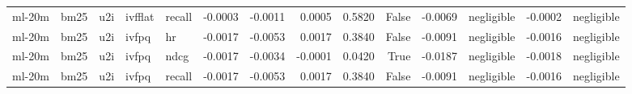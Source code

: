 \begin{tabular}{lllllrrrrrrlrl}
ml-20m & bm25 & u2i & ivfflat & recall & -0.0003 & -0.0011 & 0.0005 & 0.5820 & False & -0.0069 & negligible & -0.0002 & negligible \\
ml-20m & bm25 & u2i & ivfpq & hr & -0.0017 & -0.0053 & 0.0017 & 0.3840 & False & -0.0091 & negligible & -0.0016 & negligible \\
ml-20m & bm25 & u2i & ivfpq & ndcg & -0.0017 & -0.0034 & -0.0001 & 0.0420 & True & -0.0187 & negligible & -0.0018 & negligible \\
ml-20m & bm25 & u2i & ivfpq & recall & -0.0017 & -0.0053 & 0.0017 & 0.3840 & False & -0.0091 & negligible & -0.0016 & negligible \\
\bottomrule
\end{tabular}

